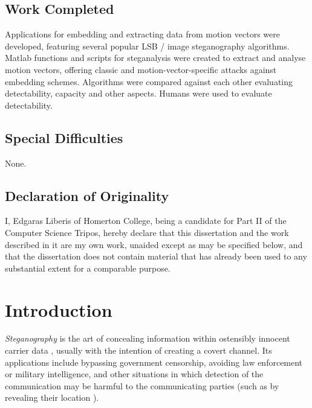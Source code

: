 \documentclass[12pt,british,twoside,notitlepage,usenames,dvipsnames,hypens,final]{report}
\renewcommand\thesubsection{\arabic{subsection}.}
\numberwithin{equation}{section}
\numberwithin{figure}{section}
\begin{document}
\section*{Work Completed}

Applications for embedding and extracting data from motion vectors were developed, featuring several popular LSB / image steganography algorithms. Matlab functions and scripts for steganalysis were created to extract and analyse motion vectors, offering classic and motion-vector-specific attacks against embedding schemes. Algorithms were compared against each other evaluating detectability, capacity and other aspects. Humans were used to evaluate detectability.

\section*{Special Difficulties}

None.

\cleardoublepage

\section*{Declaration of Originality}
I, Edgaras Liberis of Homerton College, being a candidate for Part II of the Computer Science Tripos, hereby declare that this dissertation and the work described in it are my own work, unaided except as may be specified below, and that the dissertation does not contain material that has already been used to any substantial extent for a comparable purpose.

\bigskip
{}

\medskip
{}

\cleardoublepage
\tableofcontents
\renewcommand{\thesection}{\arabic{chapter}.\arabic{section}}
\renewcommand{\thesubsection}{\arabic{chapter}.\arabic{section}.\arabic{subsection}}
\setcounter{chapter}{0}

\cleardoublepage
\chapter{Introduction}
\pagestyle{headings}
\setcounter{page}{1}

\emph{Steganography} is the art of concealing information within ostensibly innocent carrier data \cite[p. 3]{fridrich}, usually with the intention of creating a covert channel. Its applications include bypassing government censorship, avoiding law enforcement or military intelligence, and other situations in which detection of the communication may be harmful to the communicating parties (such as by revealing their location \cite{infohiding-survey}). 
 
\end{document}
